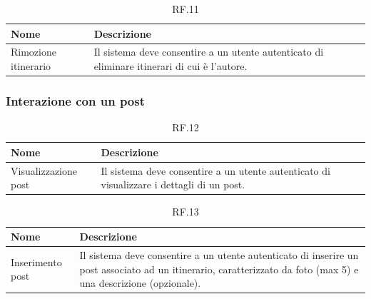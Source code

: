 \documentclass{natourDoc}
\begin{document}
\begin{table}[H]
	\centering
	\begin{tabular}{ |p{5cm}|p{10.3cm}| }
		\hline
		\rowcolor{PineGreen!70}
		\textbf{Nome}        & \textbf{Descrizione}                                                             \\
		\hline
		Rimozione itinerario & Il sistema deve consentire a un utente autenticato di eliminare itinerari di cui
		è l'autore.                                                                                             \\
		\hline
	\end{tabular}
	\caption{RF.11}

\end{table}

\subsubsection{Interazione con un post}
\begin{table}[H]
	\centering
	\begin{tabular}{ |p{5cm}|p{10.3cm}| }
		\hline
		\rowcolor{PineGreen!70}
		\textbf{Nome}        & \textbf{Descrizione}                                               \\
		\hline
		Visualizzazione post & Il sistema deve consentire a un utente autenticato di visualizzare
		i dettagli di un post.                                                                    \\
		\hline
	\end{tabular}
	\caption{RF.12}

\end{table}

\begin{table}[H]
	\centering
	\begin{tabular}{ |p{5cm}|p{10.3cm}| }
		\hline
		\rowcolor{PineGreen!70}
		\textbf{Nome}    & \textbf{Descrizione}                                                                               \\
		\hline
		Inserimento post & Il sistema deve consentire a un utente autenticato di inserire un post associato ad un itinerario,
		caratterizzato da foto (max 5) e una descrizione (opzionale).                                                         \\
		\hline
	\end{tabular}
	\caption{RF.13}

\end{table}
\end{document}
